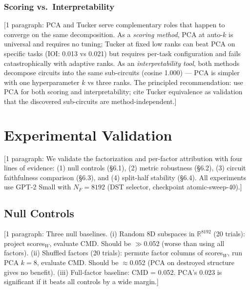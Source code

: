 \documentclass[11pt]{article}
\begin{document}

\subsubsection{Scoring vs.\ Interpretability}

[1 paragraph: PCA and Tucker serve complementary roles that happen to
converge on the same decomposition. As a \emph{scoring method}, PCA at
auto-$k$ is universal and requires no tuning; Tucker at fixed low ranks
can beat PCA on specific tasks (IOI: 0.013 vs 0.021) but requires
per-task configuration and fails catastrophically with adaptive ranks.
As an \emph{interpretability tool}, both methods decompose circuits into
the same sub-circuits (cosine 1.000) --- PCA is simpler with one
hyperparameter $k$ vs three ranks. The principled recommendation:
use PCA for both scoring and interpretability; cite Tucker equivalence
as validation that the discovered sub-circuits are method-independent.]



\section{Experimental Validation}
\label{sec:experiments}


[1 paragraph: We validate the factorization and per-factor attribution
with four lines of evidence: (1) null controls (\S6.1),
(2) metric robustness (\S6.2),
(3) circuit faithfulness comparison (\S6.3),
and (4) split-half stability (\S6.4).
All experiments use GPT-2 Small with $N_F = 8192$ (DST
selector, checkpoint atomic-sweep-40).]

\subsection{Null Controls}

[1 paragraph: Three null baselines. (i) Random 8D subspaces in
$\mathbb{R}^{8192}$ (20 trials): project scores$_W$, evaluate CMD.
Should be $\gg$0.052 (worse than using all factors). (ii) Shuffled
factors (20 trials): permute factor columns of scores$_W$, run PCA $k=8$,
evaluate CMD. Should be $\approx$0.052 (PCA on destroyed structure
gives no benefit). (iii) Full-factor baseline: CMD = 0.052. PCA's
0.023 is significant if it beats all controls by a wide margin.]
\end{document}
